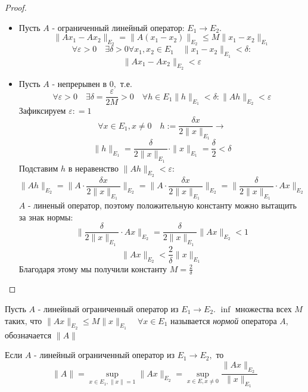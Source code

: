 \begin{proof}
    \begin{itemize}
        \item Пусть $A$ - ограниченный линейный оператор: $E_1 \to E_2$. 
        \[
            \| A x_1 - A x_2 \|_{E_2} = \| A (x_1 - x_2) \|_{E_2} \leq M \| x_1 - x_2 \|_{E_1}
        \]
        \[
            \forall \varepsilon > 0 \quad \exists \delta > 0 \forall x_1, x_2 \in E_1 \quad \| x_1 - x_2 \|_{E_1} < \delta\colon
        \]
        \[
            \| A x_1 - A x_2 \|_{E_2} < \varepsilon
        \]
        \item Пусть $A$ - непрерывен в $0,$ т.е.  
        \[
            \forall \varepsilon > 0 \quad \exists \delta = \frac{\varepsilon}{2 M} > 0 \quad \forall h \in E_1  \| h \|_{E_1} < \delta \colon
            \| A h \|_{E_2} < \varepsilon
        \] 
        Зафиксируем $\varepsilon \colon=1 $
        \[
            \forall x \in E_1, x \neq 0 \quad h:=\frac{\delta x }{2 \| x \|_{E_1}} \to
        \]
        \[
            \| h \|_{E_1}  = \frac{\delta}{2 \| x \|_{E_1}} \cdot \| x \|_{E_1} = \frac{\delta}{2} < \delta 
        \]
        Подставим $h$ в неравенство $ \| A h \|_{E_2} < \varepsilon \colon$
        \[
            \| A h \|_{E_2} = \| A \cdot \frac{\delta x}{2 \| x \|_{E_1}} \|_{E_2} = \| A \cdot \frac{\delta x}{2 \| x \|_{E_1}} \|_{E_2} = \| \frac{\delta}{2 \| x \|_{E_1}} \cdot A x \|_{E_2}
        \]
        $A$ - линеный оператор, поэтому положительную константу можно вытащить за знак нормы$\colon$
        \[
              \| \frac{\delta}{2 \| x \|_{E_1}} \cdot A x \|_{E_2} = \frac{\delta}{2 \| x \|_{E_1}} \| A x \|_{E_2} < 1
        \]
        \[
            \| A x \|_{E_2} < \frac{2}{\delta} \| x \|_{E_1}
        \]
        Благодаря этому мы получили константу $M = \frac{2}{\delta}$
    \end{itemize}
    
\end{proof}

\begin{definition}
    Пусть $A$ - линейный ограниченный оператор из $E_1 \to E_2$. $\inf$ множества всех $M$ таких, что $\| A x \|_{E_2} \leq M \| x \|_{E_1} \quad \forall x \in E_1$ называется \textit{нормой} оператора $A$, обозначается $\| A \|$
\end{definition}

\begin{proposition}
    Если $A$ - линейный ограниченный оператор из $E_1 \to E_2, $ то 
    \[
        \| A \| = \sup_{x \in E_1, \| x \| = 1} \| A x \|_{E_2} = \sup_{x \in E, x \neq 0} \frac{\| A x \|_{E_2}}{\| x \|_{E_1}} 
    \]
\end{proposition}

